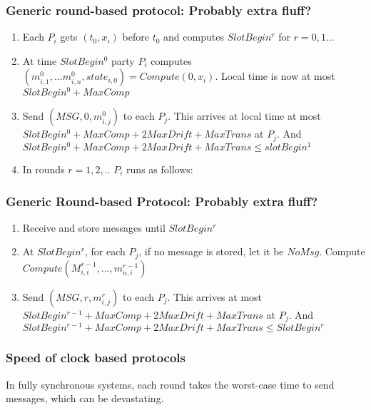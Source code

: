 \documentclass[14pt]{beamer}
\begin{document}
        \begin{frame}
            \frametitle{Generic round-based protocol: Probably extra fluff?}
                \begin{enumerate}
                    \item Each $P_i$ gets $(t_0, x_i)$ before $t_0$ and computes $SlotBegin^r$ for $r = 0, 1...$
                    \item At time $SlotBegin^0$ party $P_i$ computes $(m_{i, 1}^0, ...m_{i, n}^0, state_{i, 0}) = Compute(0, x_i)$. Local time is 
                    now at most $SlotBegin^0 + MaxComp$
                    \item Send $(MSG, 0, m_{i, j}^0)$ to each $P_j$. This arrives at local time at most $SlotBegin^0 + MaxComp + 2MaxDrift + MaxTrans$ at $P_j$. And $SlotBegin^0 + MaxComp + 2MaxDrift + MaxTrans \leq slotBegin^1$
                    \item In rounds $r = 1, 2, ..$ $P_i$ runs as follows:
                \end{enumerate}
        \end{frame}
        \begin{frame}
            \frametitle{Generic Round-based Protocol: Probably extra fluff?}
                \begin{enumerate}
                    \item Receive and store messages until $SlotBegin^r$
                    \item At $SlotBegin^r$, for each $P_j$, if no message is stored, let it be $NoMsg$. Compute $Compute(M_{i, i}^{r-1}, ..., m_{n, i}^{r - 1})$ 
                    \item Send $(MSG, r, m_{i, j}^r)$ to each $P_j$. This arrives at most $SlotBegin^{r-1} + MaxComp + 2MaxDrift + MaxTrans$ at $P_j$. And $SlotBegin^{r-1} + MaxComp + 2MaxDrift + MaxTrans \leq SlotBegin^r$
                \end{enumerate}
        \end{frame}

    \begin{frame}
        \frametitle{Speed of clock based protocols}
            In fully synchronous systems, each round takes the worst-case time to send messages, which can be devastating. 
    \end{frame}        
\end{document}
